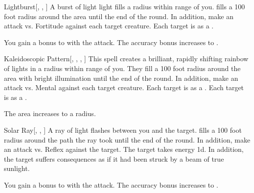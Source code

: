 \lowercase{\hypertarget{spell:Lightburst}{}}\label{spell:Lightburst}
\begin{freeability}[Rank 3]{\hypertarget{spell:Lightburst}{Lightburst}}[, , ]
A burst of light light fills a \areasmall radius  within \rngmed range of you.
 fills a 100 foot radius around the area until the end of the round.
In addition, make an attack vs. Fortitude against each target creature.
\hit Each target is \dazzled as a .

\rankline
{} You gain a  bonus to  with the attack.
 The accuracy bonus increases to .
\end{freeability}
\vspace{0.25em}



\lowercase{\hypertarget{spell:Kaleidoscopic Pattern}{}}\label{spell:Kaleidoscopic Pattern}
\begin{freeability}[Rank 4]{\hypertarget{spell:Kaleidoscopic Pattern}{Kaleidoscopic Pattern}}[, , , ]
This spell creates a brilliant, rapidly shifting rainbow of lights in a \areasmall radius within \rngmed range of you.
They fill a 100 foot radius around the area with bright illumination until the end of the round.
In addition, make an attack vs. Mental against each target creature.
\hit Each target is \dazed as a .
\crit Each target is \disoriented as a .

\rankline
{} The area increases to a \areamed radius.
\end{freeability}
\vspace{0.25em}



\lowercase{\hypertarget{spell:Solar Ray}{}}\label{spell:Solar Ray}
\begin{freeability}[Rank 4]{\hypertarget{spell:Solar Ray}{Solar Ray}}[, , ]
A ray of light flashes between you and the target.
 fills a 100 foot radius around the path the ray took until the end of the round.
In addition, make an attack vs. Reflex against the target.
\hit The target takes energy  \plus1d.
In addition, the target suffers consequences as if it had been struck by a beam of true sunlight.

\rankline
{} You gain a  bonus to  with the attack.
 The accuracy bonus increases to .
\end{freeability}
\vspace{0.25em}



